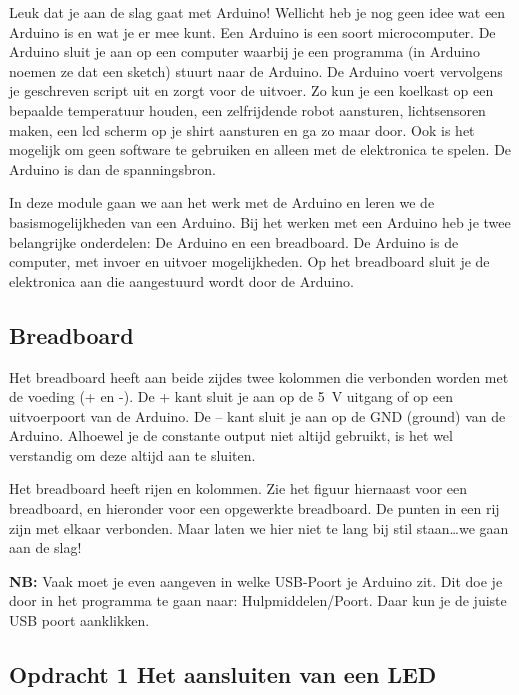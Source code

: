 \documentclass{arduino}
\begin{document}
Leuk dat je aan de slag gaat met Arduino! Wellicht heb je nog geen idee wat een Arduino is en wat je er mee kunt. Een Arduino is een soort microcomputer. De Arduino sluit je aan op een computer waarbij je een programma (in Arduino noemen ze dat een sketch) stuurt naar de Arduino. De Arduino voert vervolgens je geschreven script uit en zorgt voor de uitvoer. Zo kun je een koelkast op een bepaalde temperatuur houden, een zelfrijdende robot aansturen, lichtsensoren maken, een lcd scherm op je shirt aansturen en ga zo maar door. Ook is het mogelijk om geen software te gebruiken en alleen met de elektronica te spelen. De Arduino is dan de spanningsbron.

In deze module gaan we aan het werk met de Arduino en leren we de basismogelijkheden van een Arduino. Bij het werken met een Arduino heb je twee belangrijke onderdelen: De Arduino en een breadboard. De Arduino is de computer, met invoer en uitvoer mogelijkheden. Op het breadboard sluit je de elektronica aan die aangestuurd wordt door de Arduino.

\subsection{Breadboard}

Het breadboard heeft aan beide zijdes twee kolommen die verbonden worden met de voeding (+ en -). De + kant sluit je aan op de \SI{5}{\volt} uitgang of op een uitvoerpoort van de Arduino. De – kant sluit je aan op de GND (ground) van de Arduino. Alhoewel je de constante output niet altijd gebruikt, is het wel verstandig om deze altijd aan te sluiten.

Het breadboard heeft rijen en kolommen. Zie het figuur hiernaast voor een breadboard, en hieronder voor een opgewerkte breadboard. De punten in een rij zijn met elkaar verbonden. Maar laten we hier niet te lang bij stil staan\dots we gaan aan de slag!

\textbf{NB:} Vaak moet je even aangeven in welke USB-Poort je Arduino zit. Dit doe je door in het programma te gaan naar: Hulpmiddelen/Poort. Daar kun je de juiste USB poort aanklikken.

\newpage

\subsection{Opdracht 1 Het aansluiten van een LED}
\end{document}
